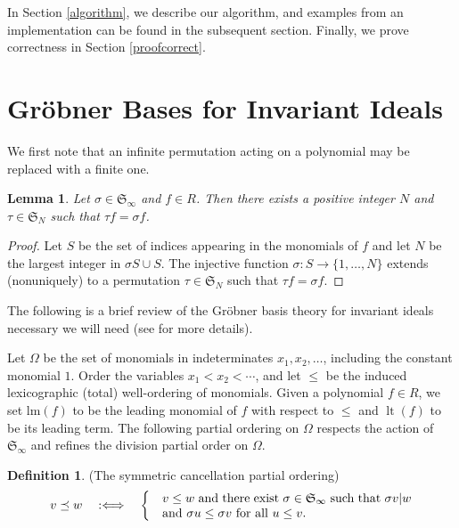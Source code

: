 \documentclass{amsart}
\newtheorem{lemma}[theorem]{Lemma}
\theoremstyle{definition}
\newtheorem{definition}[theorem]{Definition}
\newtheorem{example}[theorem]{Example}
\theoremstyle{remark}
\numberwithin{equation}{section}
\newcommand{\lt}{\operatorname{lt}}
\newcommand{\<}{\langle}
\renewcommand{\>}{\rangle}
\begin{document}

In Section \ref{algorithm}, we describe our algorithm, and examples from an implementation
can be found in the subsequent section.  %
Finally, we prove correctness in Section \ref{proofcorrect}.


\section{Gr\"obner Bases for Invariant Ideals}\label{gbinfinite}

We first note that an infinite permutation acting on
a polynomial may be replaced with a finite one.
\begin{lemma}\label{infpermfiniteperm}
Let $\sigma \in {\mathfrak S}_\infty$ and $f \in R$.  Then there
exists a positive integer $N$ and $\tau \in {\mathfrak S}_N$ such that 
$\tau f = \sigma f$.
\end{lemma}
\begin{proof}
Let $S$ be the set of indices appearing in the monomials of $f$ and let 
$N$ be the largest integer in $\sigma S \cup S$.  The injective function $\sigma: S \to \{1,\ldots,N\}$
extends (nonuniquely) to a permutation $\tau \in  {\mathfrak S}_N$ such that $\tau f = \sigma f$.
\end{proof}


The following is a brief review of the Gr\"obner basis theory for invariant
ideals necessary we will need (see \cite{AH} for more details).


Let $\Omega$ be the set of monomials in indeterminates $x_1, x_2, \ldots$, 
including the constant monomial $1$.  Order the variables $x_1 < x_2 < \cdots$, and let 
$\leq$ be the induced lexicographic (total) well-ordering of monomials.  Given
a polynomial $f \in R$, we set lm$(f)$ to be the leading monomial of $f$ with
respect to $\leq$ and $\lt(f)$ to be its leading term.
The following partial ordering on $\Omega$ respects the action of ${\mathfrak S}_\infty$
and refines the division partial order on $\Omega$.

\begin{definition}\label{defpartialord}(The symmetric cancellation partial ordering)
\[v \preceq w \quad
:\Longleftrightarrow \quad \begin{cases} &\text{\parbox{200pt}{$v \leq
      w$ and there exist $\sigma \in {\mathfrak S}_\infty$ such that $\sigma v|w$ 
      and $\sigma u \leq \sigma v$ for all $u \leq v$.}}\end{cases}\]
\end{definition}
\end{document}
